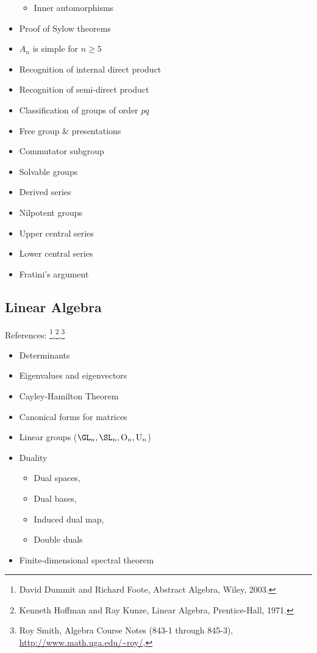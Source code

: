 \begin{itemize}
  \begin{itemize}
  \tightlist
  \item
    Inner automorphisms
  \end{itemize}
\item
  Proof of Sylow theorems
\item
  \(A_n\) is simple for \(n\geq 5\)
\item
  Recognition of internal direct product
\item
  Recognition of semi-direct product
\item
  Classification of groups of order \(pq\)
\item
  Free group \& presentations
\item
  Commutator subgroup
\item
  Solvable groups
\item
  Derived series
\item
  Nilpotent groups
\item
  Upper central series
\item
  Lower central series
\item
  Fratini's argument
\end{itemize}

\hypertarget{linear-algebra}{%
\subsection{Linear Algebra}\label{linear-algebra}}

References: \footnote{David Dummit and Richard Foote, Abstract Algebra,
  Wiley, 2003.},\footnote{Kenneth Hoffman and Ray Kunze, Linear Algebra,
  Prentice-Hall, 1971.},\footnote{Roy Smith, Algebra Course Notes (843-1
  through 845-3), \url{http://www.math.uga.edu/~roy/},}

\begin{itemize}
\item
  Determinants
\item
  Eigenvalues and eigenvectors
\item
  Cayley-Hamilton Theorem
\item
  Canonical forms for matrices
\item
  Linear groups (\(\GL_n , \SL_n, \mathrm{O}_n, \mathrm{U}_n\))
\item
  Duality

  \begin{itemize}
  \tightlist
  \item
    Dual spaces,
  \item
    Dual bases,
  \item
    Induced dual map,
  \item
    Double duals
  \end{itemize}
\item
  Finite-dimensional spectral theorem
\end{itemize}

